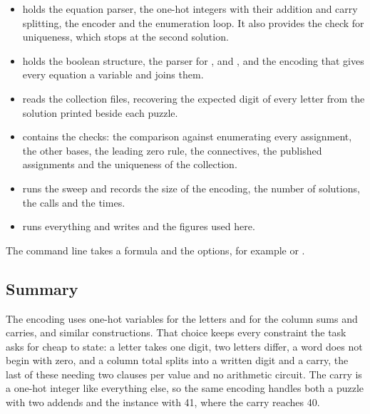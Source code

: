 \documentclass[11pt,a4paper]{article}
\begin{document}
\begin{itemize}
  \item {} holds the equation parser, the one-hot integers
  with their addition and carry splitting, the encoder and the enumeration
  loop. It also provides the check for uniqueness, which stops at the second
  solution.

  \item {} holds the boolean structure, the parser for
  ,  and , and the encoding that gives every
  equation a variable and joins them.

  \item {} reads the collection files, recovering the
  expected digit of every letter from the solution printed beside each puzzle.

  \item {} contains the checks: the comparison
  against enumerating every assignment, the other bases, the leading zero
  rule, the connectives, the published assignments and the uniqueness of the
  collection.

  \item {} runs the sweep and records the size of the encoding,
  the number of solutions, the calls and the times.

  \item {} runs everything and writes 
  and the figures used here.
\end{itemize}

The command line takes a formula and the options, for example
 or
.

\subsection*{Summary}

The encoding uses one-hot variables for the letters and for the
column sums and carries, and similar constructions. That choice keeps every constraint the task
asks for cheap to state: a letter takes one digit, two letters differ, a word
does not begin with zero, and a column total splits into a written digit and a
carry, the last of these needing two clauses per value and no arithmetic
circuit. The carry is a one-hot integer like everything else, so the same
encoding handles both a puzzle with two addends and the instance with 41,
where the carry reaches 40.
\end{document}
